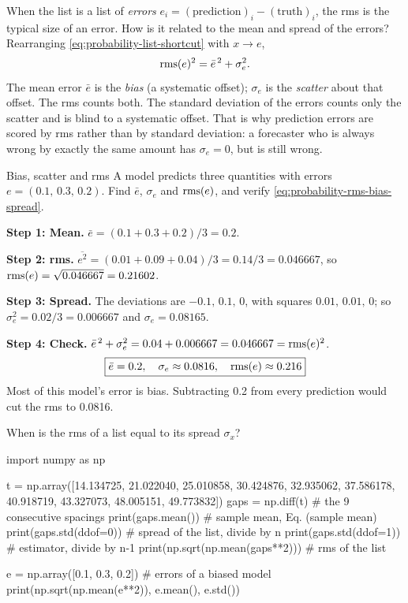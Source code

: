 When the list is a list of \emph{errors} $e_i=(\text{prediction})_i-(\text{truth})_i$, the rms is the typical size of an error. How is it related to the mean and spread of the errors? Rearranging \cref{eq:probability-list-shortcut} with $x\to e$,
\begin{equation}
\mathrm{rms}(e)^2 = \bar e^{\,2} + \sigma_e^2 .
\label{eq:probability-rms-bias-spread}
\end{equation}
The mean error $\bar e$ is the \emph{bias} (a systematic offset); $\sigma_e$ is the \emph{scatter} about that offset. The rms counts both. The standard deviation of the errors counts only the scatter and is blind to a systematic offset. That is why prediction errors are scored by rms rather than by standard deviation: a forecaster who is always wrong by exactly the same amount has $\sigma_e=0$, but is still wrong.

\begin{sample}{Bias, scatter and rms}
A model predicts three quantities with errors $e=(0.1,\,0.3,\,0.2)$. Find $\bar e$, $\sigma_e$ and $\mathrm{rms}(e)$, and verify \cref{eq:probability-rms-bias-spread}.

\textbf{Step 1: Mean.} $\bar e=(0.1+0.3+0.2)/3=0.2$.

\textbf{Step 2: rms.} $\overline{e^2}=(0.01+0.09+0.04)/3=0.14/3=0.046667$, so $\mathrm{rms}(e)=\sqrt{0.046667}=0.21602$.

\textbf{Step 3: Spread.} The deviations are $-0.1,\,0.1,\,0$, with squares $0.01,\,0.01,\,0$; so $\sigma_e^2=0.02/3=0.006667$ and $\sigma_e=0.08165$.

\textbf{Step 4: Check.} $\bar e^{\,2}+\sigma_e^2 = 0.04+0.006667=0.046667=\mathrm{rms}(e)^2$. \checkmark
\[
\boxed{\bar e=0.2,\quad \sigma_e\approx0.0816,\quad \mathrm{rms}(e)\approx0.216}
\]
Most of this model's error is bias. Subtracting 0.2 from every prediction would cut the rms to 0.0816.
\end{sample}

\begin{checkpoint}
When is the rms of a list equal to its spread $\sigma_x$?
\end{checkpoint}

\begin{pycode}
import numpy as np

t = np.array([14.134725, 21.022040, 25.010858, 30.424876, 32.935062,
              37.586178, 40.918719, 43.327073, 48.005151, 49.773832])
gaps = np.diff(t)                  # the 9 consecutive spacings
print(gaps.mean())                 # sample mean, Eq. (sample mean)
print(gaps.std(ddof=0))            # spread of the list, divide by n
print(gaps.std(ddof=1))            # estimator, divide by n-1
print(np.sqrt(np.mean(gaps**2)))   # rms of the list

e = np.array([0.1, 0.3, 0.2])      # errors of a biased model
print(np.sqrt(np.mean(e**2)), e.mean(), e.std())
\end{pycode}

